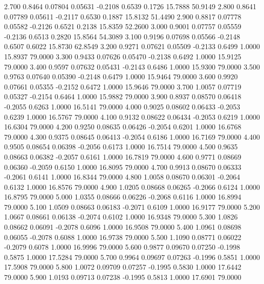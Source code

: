    2.700   0.8464   0.07804   0.05631  -0.2108   0.6539   0.1726  15.7888  50.9149
   2.800   0.8641   0.07789   0.05611  -0.2117   0.6530   0.1887  15.8132  51.4490
   2.900   0.8817   0.07778   0.05582  -0.2126   0.6521   0.2138  15.8359  52.2600
   3.000   0.9001   0.07757   0.05559  -0.2136   0.6513   0.2820  15.8564  54.3089
   3.100   0.9196   0.07698   0.05566  -0.2148   0.6507   0.6022  15.8730  62.8549
   3.200   0.9271   0.07621   0.05509  -0.2133   0.6499   1.0000  15.8937  79.0000
   3.300   0.9433   0.07626   0.05470  -0.2138   0.6492   1.0000  15.9125  79.0000
   3.400   0.9597   0.07632   0.05431  -0.2143   0.6486   1.0000  15.9300  79.0000
   3.500   0.9763   0.07640   0.05390  -0.2148   0.6479   1.0000  15.9464  79.0000
   3.600   0.9920   0.07661   0.05355  -0.2152   0.6472   1.0000  15.9646  79.0000
   3.700   1.0057   0.07719   0.05327  -0.2154   0.6464   1.0000  15.9882  79.0000
   3.900   0.8937   0.08570   0.06418  -0.2055   0.6263   1.0000  16.5141  79.0000
   4.000   0.9025   0.08602   0.06433  -0.2053   0.6239   1.0000  16.5767  79.0000
   4.100   0.9132   0.08622   0.06434  -0.2053   0.6219   1.0000  16.6304  79.0000
   4.200   0.9250   0.08635   0.06426  -0.2054   0.6201   1.0000  16.6768  79.0000
   4.300   0.9375   0.08645   0.06413  -0.2054   0.6186   1.0000  16.7169  79.0000
   4.400   0.9505   0.08654   0.06398  -0.2056   0.6173   1.0000  16.7514  79.0000
   4.500   0.9635   0.08663   0.06382  -0.2057   0.6161   1.0000  16.7819  79.0000
   4.600   0.9771   0.08669   0.06360  -0.2059   0.6150   1.0000  16.8095  79.0000
   4.700   0.9913   0.08670   0.06333  -0.2061   0.6141   1.0000  16.8344  79.0000
   4.800   1.0058   0.08670   0.06301  -0.2064   0.6132   1.0000  16.8576  79.0000
   4.900   1.0205   0.08668   0.06265  -0.2066   0.6124   1.0000  16.8795  79.0000
   5.000   1.0355   0.08666   0.06226  -0.2068   0.6116   1.0000  16.8994  79.0000
   5.100   1.0509   0.08663   0.06183  -0.2071   0.6109   1.0000  16.9177  79.0000
   5.200   1.0667   0.08661   0.06138  -0.2074   0.6102   1.0000  16.9348  79.0000
   5.300   1.0826   0.08662   0.06091  -0.2078   0.6096   1.0000  16.9508  79.0000
   5.400   1.0961   0.08698   0.06055  -0.2078   0.6088   1.0000  16.9738  79.0000
   5.500   1.1090   0.08771   0.06022  -0.2079   0.6078   1.0000  16.9996  79.0000
   5.600   0.9877   0.09670   0.07250  -0.1998   0.5875   1.0000  17.5284  79.0000
   5.700   0.9964   0.09697   0.07263  -0.1996   0.5851   1.0000  17.5908  79.0000
   5.800   1.0072   0.09709   0.07257  -0.1995   0.5830   1.0000  17.6442  79.0000
   5.900   1.0193   0.09713   0.07238  -0.1995   0.5813   1.0000  17.6901  79.0000
